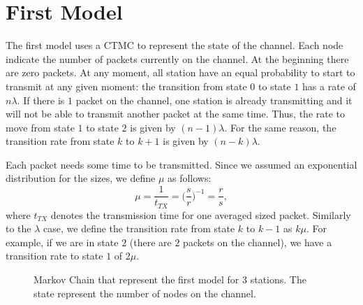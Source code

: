 \section{First Model}
\label{sec:first_model}

The first model uses a \ac{CTMC} to represent the state of the channel.
Each node indicate the number of packets currently on the channel.
At the beginning there are zero packets.
At any moment, all station have an equal probability to start to transmit at any given moment: the transition from state $0$ to state $1$ has a rate of $n \lambda$.
If there is $1$ packet on the channel, one station is already transmitting and it will not be able to transmit another packet at the same time.
Thus, the rate to move from state $1$ to state $2$ is given by $(n-1) \lambda$.
For the same reason, the transition rate from state $k$ to $k+1$ is given by $(n - k) \lambda$.

Each packet needs some time to be transmitted.
Since we assumed an exponential distribution for the sizes, we define $\mu$ as follows:
\begin{equation*}
    \mu = \frac{1}{t_{TX}}
    = \Big( \frac{s}{r} \Big) ^ {-1}
    = \frac{r}{s},
\end{equation*}
where $t_{TX}$ denotes the transmission time for one averaged sized packet.
Similarly to the $\lambda$ case, we define the transition rate from state $k$ to $k-1$ as $k\mu$.
For example, if we are in state $2$ (there are $2$ packets on the channel), we have a transition rate to state $1$ of $2\mu$.

\begin{figure}[t!]
    \centering
    \caption{Markov Chain that represent the first model for $3$ stations. The state represent the number of nodes on the channel.}
    \label{fig:simple}
\end{figure}

